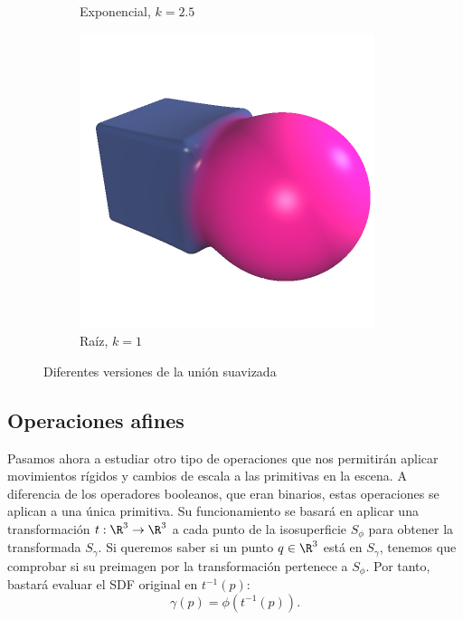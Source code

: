 \begin{figure}[htbp]
\begin{subfigure}[b]{0.25\textwidth}
        \caption{Exponencial, $k=2.5$}
    \end{subfigure}
    \hfill
    \begin{subfigure}[b]{0.25\textwidth}
        \centering
        \includegraphics[width=\textwidth]{Plantilla-TFG-master/img/unionMethodRoot.png}
        \caption{Raíz, $k=1$}
    \end{subfigure}
    
    \caption{Diferentes versiones de la unión suavizada}
    \label{fig:smoothVS}
\end{figure}

\subsection{Operaciones afines}
Pasamos ahora a estudiar otro tipo de operaciones que nos permitirán aplicar movimientos rígidos y cambios de escala a las primitivas en la escena. A diferencia de los operadores booleanos, que eran binarios, estas operaciones se aplican a una única primitiva. Su funcionamiento se basará en aplicar una transformación $t:\R^3\to \R^3$ a cada punto de la isosuperficie $S_{\phi}$ para obtener la transformada $S_{\gamma}$. Si queremos saber si un punto $q\in\R^3$ está en $S_{\gamma}$, tenemos que comprobar si su preimagen por la transformación pertenece a $S_{\phi}$. Por tanto, bastará evaluar el SDF original en $t^{-1}(p)$:
\begin{equation*}
    \gamma(p) = \phi(t^{-1}(p)).
\end{equation*}

